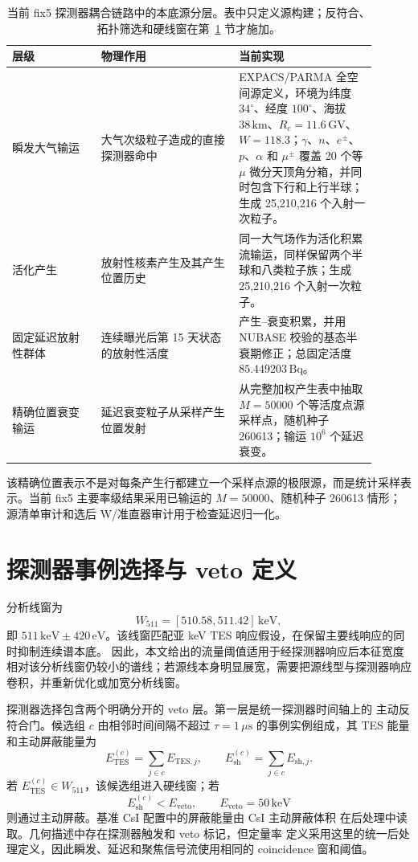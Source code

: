 \documentclass[preprint,12pt]{elsarticle}
\newcommand{\keV}{\,\mathrm{keV}}
\newcommand{\wii}{W_{511}}
\begin{document}
\begin{table}[t]
\centering
\caption{当前 fix5 探测器耦合链路中的本底源分层。表中只定义源构建；反符合、拓扑筛选和硬线窗在第~\ref{sec:selection} 节才施加。}
\label{tab:background_source_model}
\begin{tabular}{p{0.22\linewidth}p{0.34\linewidth}p{0.34\linewidth}}
\hline
层级 & 物理作用 & 当前实现 \\
\hline
瞬发大气输运 & 大气次级粒子造成的直接探测器命中 & EXPACS/PARMA 全空间源定义，环境为纬度 $34^\circ$、经度 $100^\circ$、海拔 $38\,\mathrm{km}$、$R_c=11.6\,\mathrm{GV}$、$W=118.3$；$\gamma$、$n$、$e^\pm$、$p$、$\alpha$ 和 $\mu^\pm$ 覆盖 20 个等 $\mu$ 微分天顶角分箱，并同时包含下行和上行半球；生成 25,210,216 个入射一次粒子。 \\
活化产生 & 放射性核素产生及其产生位置历史 & 同一大气场作为活化积累流输运，同样保留两个半球和八类粒子族；生成 25,210,216 个入射一次粒子。 \\
固定延迟放射性群体 & 连续曝光后第 15 天状态的放射性活度 & 产生--衰变积累，并用 NUBASE 校验的基态半衰期修正；总固定活度 $85.449203\,\mathrm{Bq}$。 \\
精确位置衰变输运 & 延迟衰变粒子从采样产生位置发射 & 从完整加权产生表中抽取 $M=50000$ 个等活度点源采样点，随机种子 260613；输运 $10^6$ 个延迟衰变。 \\
\hline
\end{tabular}
\end{table}

该精确位置表示不是对每条产生行都建立一个采样点源的极限源，而是统计采样表示。当前 fix5 主要率级结果采用已输运的 $M=50000$、随机种子 260613 情形；源清单审计和选后 W/准直器审计用于检查延迟归一化。

\section{探测器事例选择与 veto 定义}
\label{sec:selection}

分析线窗为
\begin{equation}
  \wii = [510.58,511.42]\keV,
\end{equation}
即 $511\keV\pm420\,\mathrm{eV}$。该线窗匹配亚 keV TES 响应假设，在保留主要线响应的同时抑制连续谱本底。
因此，本文给出的流量阈值适用于经探测器响应后本征宽度相对该分析线窗仍较小的谱线；若源线本身明显展宽，需要把源线型与探测器响应卷积，并重新优化或加宽分析线窗。

探测器选择包含两个明确分开的 veto 层。第一层是统一探测器时间轴上的
主动反符合门。候选组 $c$ 由相邻时间间隔不超过
$\tau=1\,\mu\mathrm{s}$ 的事例实例组成，其 TES 能量和主动屏蔽能量为
\begin{equation}
  E_{\mathrm{TES}}^{(c)}=\sum_{j\in c}E_{\mathrm{TES},j},\qquad
  E_{\mathrm{sh}}^{(c)}=\sum_{j\in c}E_{\mathrm{sh},j}.
\end{equation}
若 $E_{\mathrm{TES}}^{(c)}\in\wii$，该候选组进入硬线窗；若
\begin{equation}
  E_{\mathrm{sh}}^{(c)} < E_{\mathrm{veto}}, \qquad E_{\mathrm{veto}}=50\keV
\end{equation}
则通过主动屏蔽。基准 CsI 配置中的屏蔽能量由 CsI 主动屏蔽体积
在后处理中读取。几何描述中存在探测器触发和 veto 标记，但定量率
定义采用这里的统一后处理定义，因此瞬发、延迟和聚焦信号流使用相同的
coincidence 窗和阈值。
\end{document}
